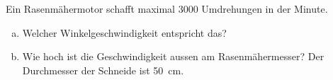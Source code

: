 
\begin{aufgabe}
\label{rasenmaeher}
	Ein Rasenmähermotor schafft maximal 3000 Umdrehungen in der Minute.
	\begin{enumerate} [a)]
		\item Welcher Winkelgeschwindigkeit entspricht das?
		\item Wie hoch ist die Geschwindigkeit aussen am Rasenmähermesser? Der Durchmesser der Schneide ist \SI{50}{cm}.
	\end{enumerate}
\end{aufgabe}
